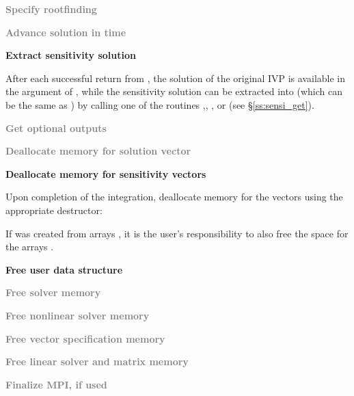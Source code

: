 \begin{Steps}
\item
  \textcolor{gray}{\bf Specify rootfinding}

\item
  \textcolor{gray}{\bf Advance solution in time}

\item
  {\bf Extract sensitivity solution}

  After each successful return from , the solution of the
  original IVP is available in the  argument of ,
  while the sensitivity solution can be extracted into  (which can 
  be the same as ) by calling one of the routines 
  ,, , or 
  (see \S\ref{ss:sensi_get}).

\item
  \textcolor{gray}{\bf Get optional outputs}

\item
  \textcolor{gray}{\bf Deallocate memory for solution vector}

\item 
  {\bf Deallocate memory for sensitivity vectors}

  Upon completion of the integration, deallocate memory for the vectors 
  using the appropriate destructor:


  If  was created from  arrays , it is the
  user's responsibility to also free the space for the arrays .

\item
  {\bf Free user data structure}

\item
  \textcolor{gray}{\bf Free solver memory}

\item
  \textcolor{gray}{\bf Free nonlinear solver memory}

\item
  \textcolor{gray}{\bf Free vector specification memory}

\item 
  \textcolor{gray}{\bf Free linear solver and matrix memory}

\item 
  \textcolor{gray}{\bf Finalize MPI, if used}
  
\end{Steps}

